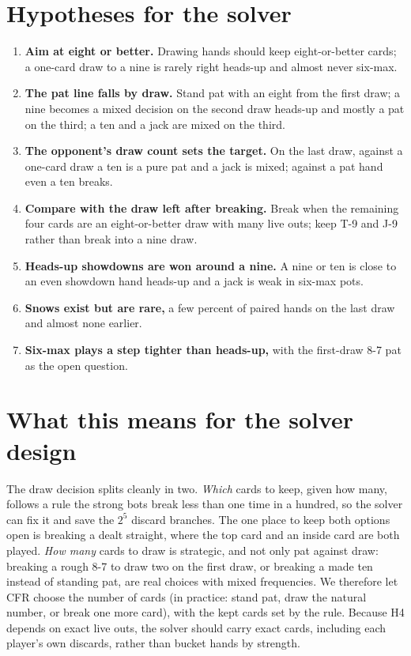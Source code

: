 \documentclass[10pt]{article}
\begin{document}
\section{Hypotheses for the solver}

\begin{enumerate}
\item[H1] \textbf{Aim at eight or better.} Drawing hands should keep eight-or-better cards; a
one-card draw to a nine is rarely right heads-up and almost never six-max.
\item[H2] \textbf{The pat line falls by draw.} Stand pat with an eight from the first draw; a nine
becomes a mixed decision on the second draw heads-up and mostly a pat on the third; a ten and a
jack are mixed on the third.
\item[H3] \textbf{The opponent's draw count sets the target.} On the last draw, against a one-card
draw a ten is a pure pat and a jack is mixed; against a pat hand even a ten breaks.
\item[H4] \textbf{Compare with the draw left after breaking.} Break when the remaining four cards
are an eight-or-better draw with many live outs; keep T-9 and J-9 rather than break into a nine
draw.
\item[H5] \textbf{Heads-up showdowns are won around a nine.} A nine or ten is close to an even
showdown hand heads-up and a jack is weak in six-max pots.
\item[H6] \textbf{Snows exist but are rare,} a few percent of paired hands on the last draw and
almost none earlier.
\item[H7] \textbf{Six-max plays a step tighter than heads-up,} with the first-draw 8-7 pat as the
open question.
\end{enumerate}

\section{What this means for the solver design}

The draw decision splits cleanly in two. \emph{Which} cards to keep, given how many, follows a rule
the strong bots break less than one time in a hundred, so the solver can fix it and save the
$2^5$ discard branches. The one place to keep both options open is breaking a dealt straight,
where the top card and an inside card are both played. \emph{How many} cards to draw is strategic, and not only pat against draw:
breaking a rough 8-7 to draw two on the first draw, or breaking a made ten instead of standing pat,
are real choices with mixed frequencies. We therefore let CFR choose the number of cards (in
practice: stand pat, draw the natural number, or break one more card), with the kept cards set by
the rule. Because H4 depends on exact live outs, the solver should carry exact cards, including
each player's own discards, rather than bucket hands by strength.
\end{document}
